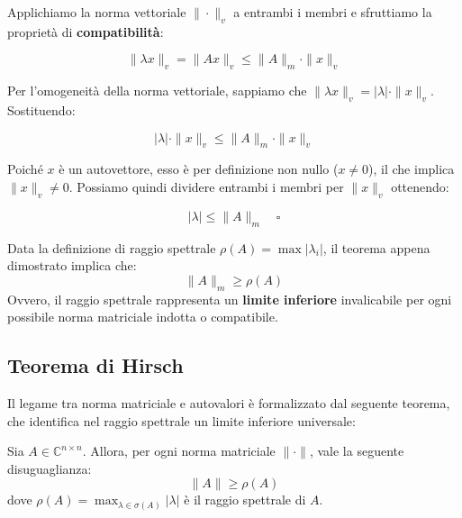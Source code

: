 \documentclass[a4paper,12pt]{article}
\begin{document}
	Applichiamo la norma vettoriale $\|\cdot\|_v$ a entrambi i membri e sfruttiamo la proprietà di \textbf{compatibilità}:
	
	\begin{equation*}
		\|\lambda x\|_v = \|Ax\|_v \le \|A\|_m \cdot \|x\|_v
	\end{equation*}
	
	Per l'omogeneità della norma vettoriale, sappiamo che $\|\lambda x\|_v = |\lambda| \cdot \|x\|_v$. Sostituendo:
	
	\begin{equation*}
		|\lambda| \cdot \|x\|_v \le \|A\|_m \cdot \|x\|_v
	\end{equation*}
	
	Poiché $x$ è un autovettore, esso è per definizione non nullo ($x \neq 0$), il che implica $\|x\|_v \neq 0$. Possiamo quindi dividere entrambi i membri per $\|x\|_v$ ottenendo:
	
	\begin{equation}
		|\lambda| \le \|A\|_m \quad \square
	\end{equation}
	
	\begin{tcolorbox}[title=Corollario Fondamentale, colback=yellow!5!white]
		Data la definizione di raggio spettrale $\rho(A) = \max |\lambda_i|$, il teorema appena dimostrato implica che:
		\begin{equation}
			\|A\|_m \ge \rho(A)
		\end{equation}
		Ovvero, il raggio spettrale rappresenta un \textbf{limite inferiore} invalicabile per ogni possibile norma matriciale indotta o compatibile.
	\end{tcolorbox}
	\subsection{Teorema di Hirsch}
	
	Il legame tra norma matriciale e autovalori è formalizzato dal seguente teorema, che identifica nel raggio spettrale un limite inferiore universale:
	
	\begin{tcolorbox}[title=Teorema di Hirsch, colback=red!5!white, colframe=red!75!black]
		Sia $A \in \mathbb{C}^{n \times n}$. Allora, per ogni norma matriciale $\|\cdot\|$, vale la seguente disuguaglianza:
		\begin{equation}
			\|A\| \ge \rho(A)
		\end{equation}
		dove $\rho(A) = \max_{\lambda \in \sigma(A)} |\lambda|$ è il raggio spettrale di $A$.
	\end{tcolorbox}
	
\end{document}
